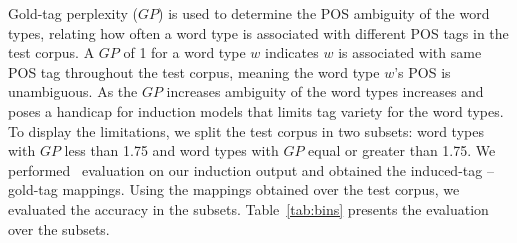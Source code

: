 Gold-tag perplexity ($GP$) is used to determine the POS ambiguity of
the word types, relating how often a word type is associated with
different POS tags in the test corpus.  A $GP$ of 1 for a word type
$w$ indicates $w$ is associated with same POS tag throughout the test
corpus, meaning the word type $w$'s POS is unambiguous.  As the $GP$
increases ambiguity of the word types increases and poses a handicap
for induction models that limits tag variety for the word types.  To
display the limitations, we split the test corpus in two subsets: word
types with $GP$ less than 1.75 and word types with $GP$ equal or
greater than 1.75.  We performed \mto\ evaluation on our induction
output and obtained the induced-tag -- gold-tag mappings. Using the
mappings obtained over the test corpus, we evaluated the accuracy in
the subsets.  Table~\ref{tab:bins} presents the evaluation over the
subsets.

